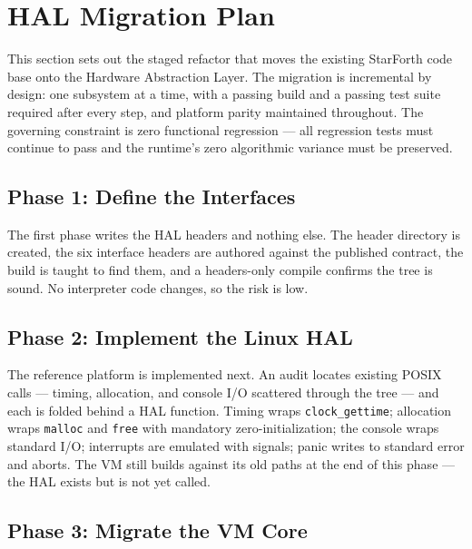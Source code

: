 
\section{HAL Migration Plan}

This section sets out the staged refactor that moves the existing StarForth
code base onto the Hardware Abstraction Layer. The migration is incremental by
design: one subsystem at a time, with a passing build and a passing test suite
required after every step, and platform parity maintained throughout. The
governing constraint is zero functional regression --- all regression tests must
continue to pass and the runtime's zero algorithmic variance must be preserved.

\subsection{Phase 1: Define the Interfaces}

The first phase writes the HAL headers and nothing else. The header directory is
created, the six interface headers are authored against the published contract,
the build is taught to find them, and a headers-only compile confirms the tree
is sound. No interpreter code changes, so the risk is low.

\subsection{Phase 2: Implement the Linux HAL}

The reference platform is implemented next. An audit locates existing POSIX
calls --- timing, allocation, and console I/O scattered through the tree --- and
each is folded behind a HAL function. Timing wraps \texttt{clock\_gettime};
allocation wraps \texttt{malloc} and \texttt{free} with mandatory
zero-initialization; the console wraps standard I/O; interrupts are emulated with
signals; panic writes to standard error and aborts. The VM still builds against
its old paths at the end of this phase --- the HAL exists but is not yet called.

\subsection{Phase 3: Migrate the VM Core}

